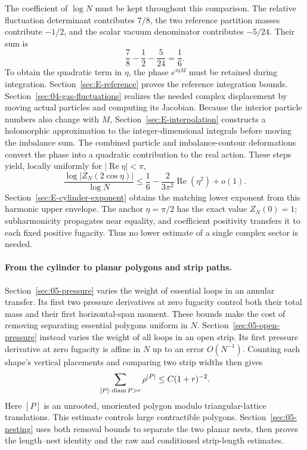 The coefficient of $\log N$ must be kept throughout this comparison.
The relative fluctuation determinant contributes $7/8$, the two
reference partition masses contribute $-1/2$, and the scalar vacuum
denominator contributes $-5/24$. Their sum is
\[
 \frac78-\frac12-\frac5{24}=\frac16.
\]
To obtain the quadratic term in $\eta$, the phase $e^{i\eta M}$
must be retained during integration.
Section~\ref{sec:E-reference} proves the reference integration
bounds. Section~\ref{sec:04-gas-fluctuations} realizes the needed
complex displacement by moving actual particles and computing its
Jacobian. Because the interior particle numbers also change with $M$,
Section~\ref{sec:E-interpolation} constructs a holomorphic approximation
to the integer-dimensional integrals before moving the imbalance sum.
The combined particle and imbalance-contour deformations convert the
phase into a quadratic contribution to the real action.
These steps yield, locally uniformly for $|\operatorname{Re}\eta|<\pi$,
\[
 \frac{\log|Z_N(2\cos\eta)|}{\log N}
 \le \frac16-\frac{2}{3\pi^2}\operatorname{Re}(\eta^2)+o(1).
\]
Section~\ref{sec:E-cylinder-exponent} obtains the matching lower
exponent from this harmonic upper envelope. The anchor $\eta=\pi/2$
has the exact value $Z_N(0)=1$; subharmonicity propagates near equality,
and coefficient positivity transfers it to each fixed positive
fugacity. Thus no lower estimate of a single complex sector is needed.

\paragraph{From the cylinder to planar polygons and strip paths.}
Section~\ref{sec:05-pressure} varies the weight of essential loops
in an annular transfer. Its first two pressure derivatives at zero fugacity control
both their total mass and their first horizontal-span moment. These
bounds make the cost of removing separating essential polygons uniform
in $N$.
Section~\ref{sec:05-open-pressure} instead varies the weight of all
loops in an open strip. Its first pressure derivative at zero fugacity
is affine in $N$ up to an error $O(N^{-1})$. Counting each shape's
vertical placements and comparing two strip widths then gives
\[
 \sum_{[P]:\,\operatorname{diam} P>r}\rho^{|P|}\le C(1+r)^{-2}.
\]
Here $[P]$ is an unrooted, unoriented polygon modulo triangular-lattice
translations. This estimate controls large contractible polygons.
Section~\ref{sec:05-nesting} uses both removal bounds to separate
the two planar nests, then proves the length--nest identity and the
raw and conditioned strip-length estimates.

